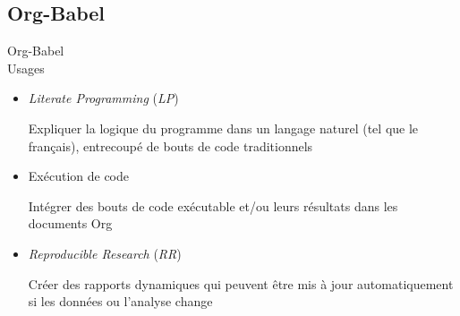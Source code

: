 \documentclass[presentation,t,hideothersubsections]{beamer}
\begin{document}
\subsection{Org-Babel}
\label{sec-5-7}

\begin{frame}[label=sec-5-7-1]{Org-Babel \\ Usages}
\begin{itemize}
\item \emph{Literate Programming} (\emph{LP})

Expliquer la logique du programme dans un langage naturel (tel que le
français), entrecoupé de bouts de code traditionnels

\item Exécution de code

Intégrer des bouts de code exécutable et/ou leurs résultats dans les
documents Org

\item \emph{Reproducible Research} (\emph{RR})

Créer des rapports dynamiques qui peuvent être mis à jour automatiquement si
les données ou l'analyse change
\end{itemize}
\end{frame}
\end{document}
